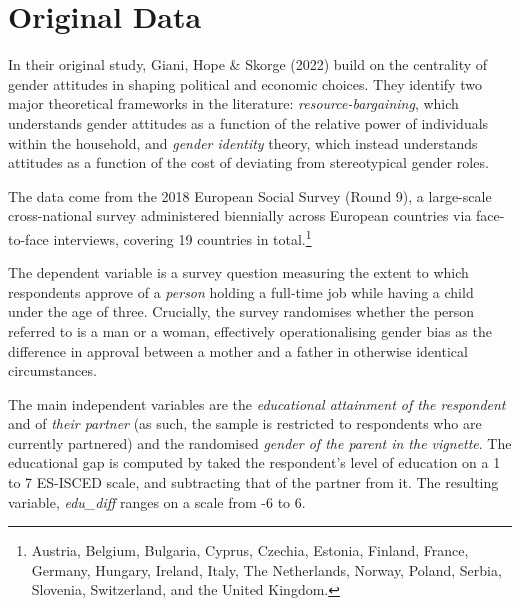\documentclass[12pt,letterpaper]{article}
\begin{document}
\section{Original Data}

\vspace{0.5cm}

\noindent In their original study, Giani, Hope \& Skorge (2022) build on the centrality of gender attitudes in shaping political and economic choices. They identify two major theoretical frameworks in the literature: \emph{resource-bargaining}, which understands gender attitudes as a function of the relative power of individuals within the household, and \emph{gender identity} theory, which instead understands attitudes as a function of the cost of deviating from stereotypical gender roles.

\noindent The data come from the 2018 European Social Survey (Round 9), a large-scale cross-national survey administered biennially across European countries via face-to-face interviews, covering 19 countries in total.\footnote{Austria, Belgium, Bulgaria, Cyprus, Czechia, Estonia, Finland, France, Germany, Hungary, Ireland, Italy, The Netherlands, Norway, Poland, Serbia, Slovenia, Switzerland, and the United Kingdom.}

\vspace{0.5cm}


\vspace{0.5cm}


\noindent The dependent variable is a survey question measuring the extent to which respondents approve of a \emph{person} holding a full-time job while having a child under the age of three. Crucially, the survey randomises whether the person referred to is a man or a woman, effectively operationalising gender bias as the difference in approval between a mother and a father in otherwise identical circumstances.

\vspace{0.5cm}


\vspace{0.5cm}

\noindent The main independent variables are the \emph{educational attainment of the respondent} and of \emph{their partner} (as such, the sample is restricted to respondents who are currently partnered) and the randomised \emph{gender of the parent in the vignette}. The educational gap is computed by taked the respondent's level of education on a 1 to 7 ES-ISCED scale, and subtracting that of the partner from it. The resulting variable, \emph{edu\_diff} ranges on a scale from -6 to 6.
\end{document}
